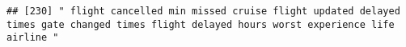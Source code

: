 \documentclass[
]{article}
\begin{document}
\begin{verbatim}
## [230] " flight cancelled min missed cruise flight updated delayed times gate changed times flight delayed hours worst experience life airline "                                                                                                                                                                                                                                                                                                                                                                                                                                                                                                                                                                                                                                                                                                                                                                                                                                                                                                                                                                                                                                                                                                                                                                                                                                                                                                                                                                                                                                                                                                                                                                                                                                                       

\end{verbatim}
\end{document}
